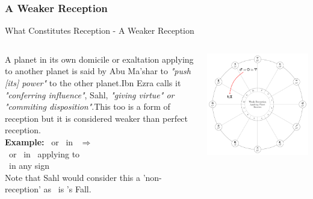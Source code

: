 \subsubsection{A Weaker Reception}
\begin{frame}[t]{What Constitutes Reception - A Weaker Reception}
\begin{columns}[T, onlytextwidth]
A planet in its own domicile or exaltation applying to another planet is said by Abu Ma'shar to \textsl{"push [its] power"} to the other planet.\footnotemark[1] Ibn Ezra calls it \textsl{"conferring influence"}, Sahl, \textsl{"giving virtue" or "commiting disposition"}.\footnotemark[2]This too is a form of reception but it is considered weaker than perfect reception.\\
\vspace{0.2cm}
\textbf{Example:} \Mars\ or \Sun\ in \Aries\ $\Rightarrow$  \Saturn \\
\ul
\vspace{0.2cm}
\Mars\ or \Sun\ in \Aries\ applying to  \\
\Saturn\ in any sign \\
\vspace{0.5cm}
Note that Sahl would consider this a 'non-reception' as \Aries\ is \Saturn's Fall.\footnotemark[3]

\vspace{-0.5cm}
\begin{center}
{\includegraphics[width=\textwidth]{charts/01-weaker-reception}} \\
\end{center}

\end{columns}
\vspace{0.2cm}
\end{frame}
